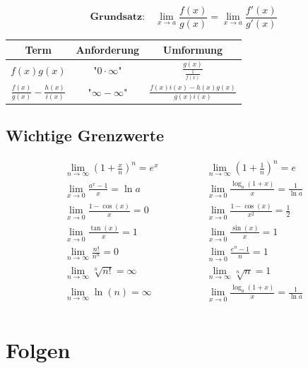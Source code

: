 \documentclass[11pt]{article}
\begin{document}
\begin{equation*}
	\textbf{Grundsatz:}\quad\lim_{x\to a}\frac{f(x)}{g(x)} = \lim_{x\to a}\frac{f'(x)}{g'(x)}
\end{equation*}

\begin{table}[H]
\centering
\begin{tabular}{|c|c|c|}
\hline
\textbf{Term} & \textbf{Anforderung} & \textbf{Umformung} \\ \hline
$f(x)g(x)$              & "$0\cdot\infty$"                     & $\frac{g(x)}{\frac{1}{f(x)}}$          \\ \hline 
$\frac{f(x)}{g(x)} - \frac{h(x)}{i(x)}$ & "$\infty - \infty$"  & $\frac{f(x)i(x) - h(x)g(x)}{g(x)i(x)}$ \\ \hline      
\end{tabular}
\end{table}

\subsection{Wichtige Grenzwerte}

\begin{equation*}
\begin{split}
	\lim\limits_{n \to \infty} \left( 1+\frac{x}{n} \right)^n = e^x \qquad & \qquad \lim\limits_{n \to \infty} \left( 1+\frac{1}{n} \right)^n = e \\
	\lim\limits_{x \to 0} \frac{a^x-1}{x} = \ln a \qquad & \qquad \lim\limits_{x \to 0} \frac{\log_a(1+x)}{x} = \frac{1}{\ln a} \\
	\lim\limits_{x \to 0} \frac{1-\cos(x)}{x} = 0 \quad \qquad & \qquad \lim\limits_{x \to 0} \frac{1-\cos(x)}{x^2} = \frac{1}{2} \\
	\lim\limits_{x \to 0} \frac{\tan(x)}{x} = 1 \qquad & \qquad \lim\limits_{x \to 0} \frac{\sin(x)}{x} = 1 \\
	\lim\limits_{n \to \infty} \frac{n!}{n^n} = 0 \qquad & \qquad \lim\limits_{n \to 0} \frac{e^n -1 }{n} = 1 \\
	\lim\limits_{n \to \infty} \sqrt[n]{n!} = \infty \qquad & \qquad \lim\limits_{n \to \infty} \sqrt[n]{n} = 1 \\
	\lim\limits_{n \to \infty} \ln(n) = \infty \qquad & \qquad \lim\limits_{x \to 0} \frac{\log_a(1+x)}{x} = \frac{1}{\ln a} \\
\end{split}
\end{equation*}

\section{Folgen}
\end{document}
